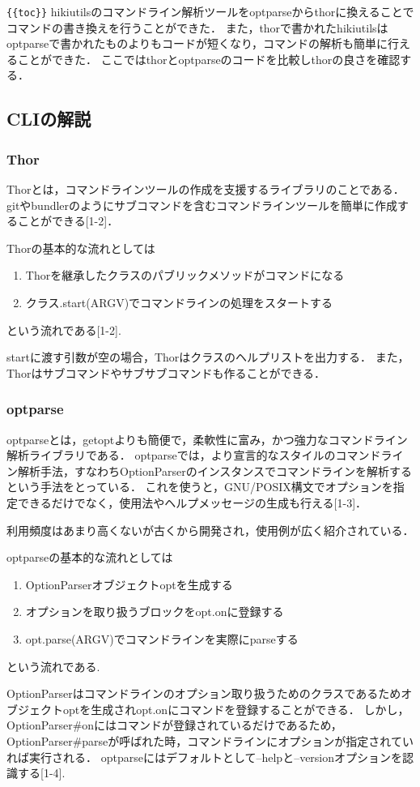 \verb|{{toc}}|
hikiutilsのコマンドライン解析ツールをoptparseからthorに換えることでコマンドの書き換えを行うことができた．
また，thorで書かれたhikiutilsはoptparseで書かれたものよりもコードが短くなり，コマンドの解析も簡単に行えることができた．
ここではthorとoptparseのコードを比較しthorの良さを確認する．

\subsection{CLIの解説}
\subsubsection{Thor}
Thorとは，コマンドラインツールの作成を支援するライブラリのことである．
gitやbundlerのようにサブコマンドを含むコマンドラインツールを簡単に作成することができる[1-2]．

Thorの基本的な流れとしては

\begin{enumerate}
\item Thorを継承したクラスのパブリックメソッドがコマンドになる
\item クラス.start(ARGV)でコマンドラインの処理をスタートする
\end{enumerate}
という流れである[1-2].

startに渡す引数が空の場合，Thorはクラスのヘルプリストを出力する．
また，Thorはサブコマンドやサブサブコマンドも作ることができる．

\subsubsection{optparse}
optparseとは，getoptよりも簡便で，柔軟性に富み，かつ強力なコマンドライン解析ライブラリである．
optparseでは，より宣言的なスタイルのコマンドライン解析手法，すなわちOptionParserのインスタンスでコマンドラインを解析するという手法をとっている．
これを使うと，GNU/POSIX構文でオプションを指定できるだけでなく，使用法やヘルプメッセージの生成も行える[1-3]．

利用頻度はあまり高くないが古くから開発され，使用例が広く紹介されている．

optparseの基本的な流れとしては

\begin{enumerate}
\item OptionParserオブジェクトoptを生成する
\item オプションを取り扱うブロックをopt.onに登録する
\item opt.parse(ARGV)でコマンドラインを実際にparseする
\end{enumerate}
という流れである.

OptionParserはコマンドラインのオプション取り扱うためのクラスであるためオブジェクトoptを生成されopt.onにコマンドを登録することができる．
しかし，OptionParser\#onにはコマンドが登録されているだけであるため，OptionParser\#parseが呼ばれた時，コマンドラインにオプションが指定されていれば実行される．
optparseにはデフォルトとして--helpと--versionオプションを認識する[1-4].

